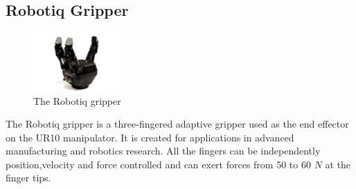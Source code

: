 \documentclass[times, utf8, diplomski, english]{fer}
\begin{document}
\subsection{Robotiq Gripper}
\begin{figure}[h]
\centering
\includegraphics[width=0.3\textwidth]{robotiq}
\caption{The Robotiq gripper}
\end{figure}
The Robotiq gripper is a three-fingered adaptive gripper used as the end effector on the UR10 manipulator.
It is created for applications in advanced manufacturing and robotics research. 
All the fingers can be independently position,velocity and force controlled and can exert forces from 50 to 60 $N$ at the finger tips.
\end{document}
